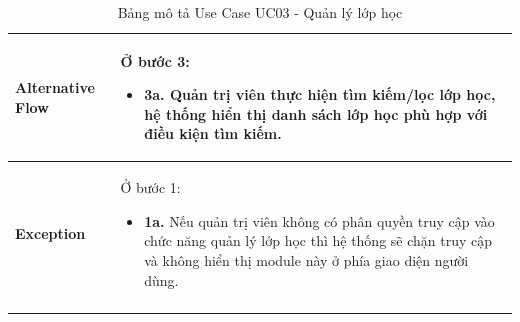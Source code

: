 \begin{longtable}{|m{}|m{}|}
\textbf{Alternative Flow} 
& Ở bước 3:
\begin{itemize}
    \item \textbf{3a.} Quản trị viên thực hiện tìm kiếm/lọc lớp học, hệ thống hiển thị danh sách lớp học phù hợp với điều kiện tìm kiếm.
\end{itemize}
\\ \hline

\textbf{Exception} 
& Ở bước 1:
\begin{itemize}
    \item \textbf{1a.} Nếu quản trị viên không có phân quyền truy cập vào chức năng quản lý lớp học thì hệ thống sẽ chặn truy cập và không hiển thị module này ở phía giao diện người dùng.
\end{itemize}
\\ \hline
\caption{Bảng mô tả Use Case UC03 - Quản lý lớp học} 
\end{longtable}


